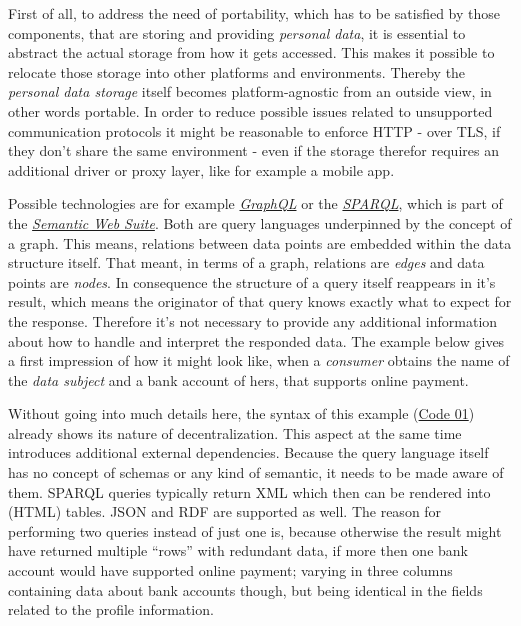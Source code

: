 \documentclass[12pt,english,a4paper,titlepage,cleardoublepage=empty,dottedtoc]{report}
\begin{document}
First of all, to address the need of portability, which has to be
satisfied by those components, that are storing and providing
\emph{personal data}, it is essential to abstract the actual storage
from how it gets accessed. This makes it possible to relocate those
storage into other platforms and environments. Thereby the
\emph{personal data storage} itself becomes platform-agnostic from an
outside view, in other words portable. In order to reduce possible
issues related to unsupported communication protocols it might be
reasonable to enforce HTTP - over TLS, if they don't share the same
environment - even if the storage therefor requires an additional driver
or proxy layer, like for example a mobile app.

Possible technologies are for example
\emph{\protect\hyperlink{link-graphql}{GraphQL}} or the
\emph{\protect\hyperlink{link-sparql}{SPARQL}}, which is part of the
\emph{\protect\hyperlink{link-semantic-web}{Semantic Web Suite}}. Both
are query languages underpinned by the concept of a graph. This means,
relations between data points are embedded within the data structure
itself. That meant, in terms of a graph, relations are \emph{edges} and
data points are \emph{nodes}. In consequence the structure of a query
itself reappears in it's result, which means the originator of that
query knows exactly what to expect for the response. Therefore it's not
necessary to provide any additional information about how to handle and
interpret the responded data. The example below gives a first impression
of how it might look like, when a \emph{consumer} obtains the name of
the \emph{data subject} and a bank account of hers, that supports online
payment.

Without going into much details here, the syntax of this example
(\protect\hyperlink{code-01_sparql-query}{Code 01}) already shows its
nature of decentralization. This aspect at the same time introduces
additional external dependencies. Because the query language itself has
no concept of schemas or any kind of semantic, it needs to be made aware
of them. SPARQL queries typically return XML which then can be rendered
into (HTML) tables. JSON and RDF are supported as well. The reason for
performing two queries instead of just one is, because otherwise the
result might have returned multiple ``rows'' with redundant data, if
more then one bank account would have supported online payment; varying
in three columns containing data about bank accounts though, but being
identical in the fields related to the profile information.
\end{document}
